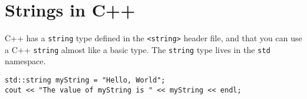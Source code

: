 \documentclass{article}
\begin{document}
\section{Strings in C++}
C++ has a \texttt{string} type defined in the \texttt{<string>} header file, and that you
can use a C++ \texttt{string} almost like a basic type. The \texttt{string} type lives in the
\texttt{std} namespace.
\begin{verbatim}
std::string myString = "Hello, World";
cout << "The value of myString is " << myString << endl;
\end{verbatim}
\end{document}
